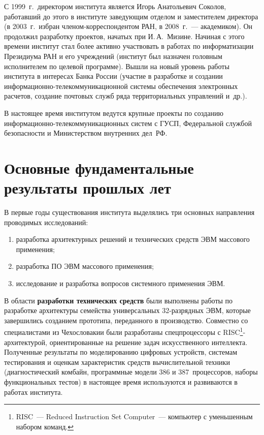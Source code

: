 \begin{multicols}{2}
     С 1999~г.\ директором института является Игорь
Анатольевич Соколов, работавший до этого в институте
заведующим отделом и заместителем директора (в 2003~г.\ избран
чле\-ном-кор\-рес\-пон\-ден\-том РАН, в 2008~г.~--- академиком). Он
продолжил разработку проектов, начатых при И.\,А.~Мизине.
%
     Начиная с этого времени институт стал более активно
участвовать в работах по информатизации Президиума РАН и его
учреждений (институт был назначен головным исполнителем по
целевой программе). Вышли на новый уровень работы института в
интересах Банка России (участие в разработке и создании
ин\-фор\-ма\-ци\-он\-но-те\-ле\-ком\-му\-ни\-ка\-ци\-он\-ной системы обеспечения
электронных расчетов, создание поч\-то\-вых служб ряда
территориальных управлений и~др.).
{

}

     В настоящее время институтом ведутся крупные проекты по
созданию ин\-фор\-ма\-ци\-он\-но-те\-ле\-ком\-му\-ни\-ка\-ци\-он\-ных систем с ГУСП,
Федеральной службой безопасности и Министерством внутренних
дел~РФ.\\[-28pt]



\section{Основные фундаментальные результаты прошлых лет}

     В первые годы существования института выделялись три
основных направления проводимых исследований:\\[-13pt]
     \begin{enumerate}[(1)]
\item разработка архитектурных решений и технических средств
ЭВМ массового применения;
\item разработка ПО ЭВМ массового
применения;
\item исследование и разработка вопросов системного применения
ЭВМ.
\end{enumerate}

     В области \textbf{разработки технических средств} были
выполнены работы по разработке архитектуры %
семейства
универсальных 32-разрядных ЭВМ, %
которые завершились созданием
прототипа, переданного в производство. Совместно со
специалистами из Чехословакии были разработаны спецпроцессоры
с RISC\footnote{RISC~--- Reduced Instruction Set Computer~--- компьютер
с уменьшенным набором команд.}-ар\-хи\-тек\-ту\-рой, ориентированные на решение задач
искусственного интеллекта. Полученные результаты по
моделированию циф\-ро\-вых устройств, системам тестирования и
оценкам характеристик средств вычислительной %
техники
(диаг\-нос\-ти\-че\-ский комбайн, программные модели 386 и
387~процессоров, наборы функциональных тестов) в настоящее
время используются и развиваются в работах института.
{

}
\end{multicols}
